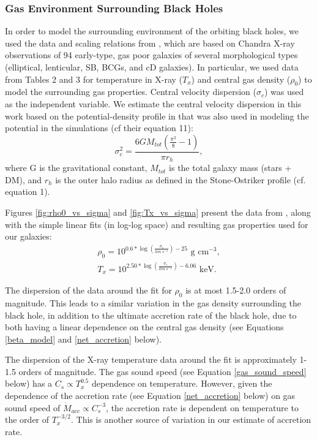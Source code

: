 \documentclass[fleqn,usenatbib,useAMS]{mnras}
\begin{document}
\subsubsection{Gas Environment Surrounding Black Holes}
In order to model the surrounding environment of the orbiting black holes, we used the data and scaling relations from \citet{2018ApJ...857...32B}, which are based on Chandra X-ray observations of 94 early-type, gas poor galaxies of several morphological types (elliptical, lenticular, SB, BCGs, and cD galaxies).  In particular, we used data from Tables 2 and 3 for temperature in X-ray ($T_x$) and central gas density ($\rho_0$) to model the surrounding gas properties.  Central velocity dispersion ($\sigma_c$) was used as the independent variable.  We estimate the central velocity dispersion in this work based on the potential-density profile in  \citet{2015ApJ...806L..28S} that was also used in modeling the potential in the simulations (cf their equation 11):
\begin{equation}
    \sigma_c^2 = \frac{6GM_{tot}(\frac{\pi^2}{8}-1)}{{\pi}r_h},
\end{equation}
where G is the gravitational constant, $M_{tot}$ is the total galaxy mass (stars + DM), and $r_h$ is the outer halo radius as defined in the Stone-Ostriker profile (cf. equation 1).

Figures \ref{fig:rho0_vs_sigma} and \ref{fig:Tx_vs_sigma} present the data from \citet{2018ApJ...857...32B}, along with the simple linear fits (in log-log space) and resulting gas properties used for our galaxies:
\begin{subequations} \label{eq:gas_properties}
\begin{eqnarray}
    \rho_0 = 10^{0.6*\log\left(\frac{\sigma_c}{km\ s^{-1}}\right) - 25} \text{  g cm}^{-3},\\
    T_x = 10^{2.50*\log\left(\frac{\sigma_c}{km\ s^{-1}}\right) - 6.06} \text{  keV}.
\end{eqnarray}
\end{subequations}

The dispersion of the data around the fit for $\rho_0$ is at most 1.5-2.0 orders of magnitude.  This leads to a similar variation in the gas density surrounding the black hole, in addition to the ultimate accretion rate of the black hole, due to both having a linear dependence on the central gas density (see Equations \eqref{beta_model} and \eqref{net_accretion} below).

The dispersion of the X-ray temperature data around the fit is approximately 1-1.5 orders of magnitude.  The gas sound speed (see Equation \eqref{gas_sound_speed} below) has a $C_s{\propto}T_x^{0.5}$ dependence on temperature.  However, given the dependence of the accretion rate (see Equation \eqref{net_accretion} below) on gas sound speed of $\dot{M}_{acc}{\propto}C_s^{-3}$, the accretion rate is dependent on temperature to the order of $T_x^{-3/2}$.  This is another source of variation in our estimate of accretion rate.
\end{document}
